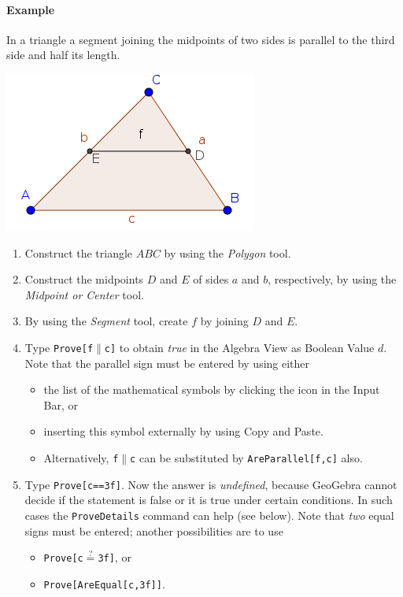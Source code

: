 \documentclass{article}
\begin{document}

\paragraph{Example}
In a triangle a segment joining the midpoints of two sides
is parallel to the third side and half its length.
\begin{center}
\includegraphics[scale=0.5]{Prove-example}
\end{center}
\begin{enumerate}
\item Construct the triangle $ABC$ by using the \textit{Polygon} tool.
\item Construct the midpoints $D$ and $E$ of sides $a$ and $b$, respectively, by using the \textit{Midpoint or Center} tool.
\item By using the \textit{Segment} tool, create $f$ by joining $D$ and $E$.
\item Type \texttt{Prove[f$\parallel$c]} to obtain \textit{true} in the Algebra View as Boolean Value $d$. Note that the parallel sign must be entered by using either
\begin{itemize}
\item the list of the mathematical symbols by clicking the \framebox{$\alpha$} icon in the Input Bar, or
\item inserting this symbol externally by using Copy and Paste.
\item Alternatively, \texttt{f$\parallel$c} can be substituted by \texttt{AreParallel[f,c]} also.
\end{itemize}

\item Type \texttt{Prove[c==3f]}. Now the answer is \textit{undefined}, because GeoGebra cannot decide if the statement is false or it is true under certain conditions. In such cases the \texttt{ProveDetails} command can help (see below). Note that \textit{two} equal signs must be entered; another possibilities are to use
\begin{itemize}
    \item \texttt{Prove[c$\stackrel{?}{=}$3f]}, or
    \item \texttt{Prove[AreEqual[c,3f]]}.
\end{itemize}

\end{enumerate}
\end{document}
